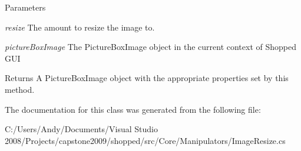 \begin{DoxyParams}{Parameters}
\item[{\em resize}]The amount to resize the image to. \item[{\em pictureBoxImage}]The PictureBoxImage object in the current context of Shopped GUI \end{DoxyParams}
\begin{DoxyReturn}{Returns}
A PictureBoxImage object with the appropriate properties set by this method. 
\end{DoxyReturn}


The documentation for this class was generated from the following file:\begin{DoxyCompactItemize}
\item 
C:/Users/Andy/Documents/Visual Studio 2008/Projects/capstone2009/shopped/src/Core/Manipulators/ImageResize.cs\end{DoxyCompactItemize}

